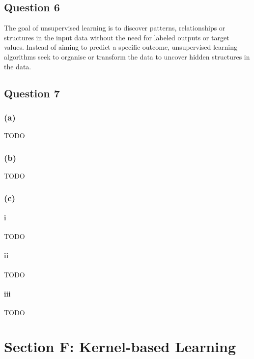 \documentclass[10pt]{article}
\begin{document}
\subsection*{Question 6}

The goal of unsupervised learning is to discover patterns, relationships or structures in the input data
without the need for labeled outputs or target values. Instead of aiming to predict a specific outcome,
unsupervised learning algorithms seek to organise or transform the data to uncover hidden structures
in the data.

\subsection*{Question 7}

\subsubsection*{(a)}

TODO

\subsubsection*{(b)}

TODO

\subsubsection*{(c)}

\paragraph*{i}

TODO

\paragraph*{ii}

TODO

\paragraph*{iii}

TODO

\section*{Section F: Kernel-based Learning}
\end{document}
